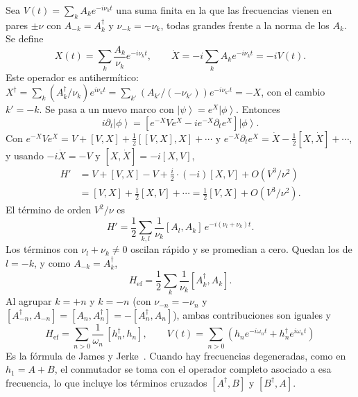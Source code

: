 \documentclass[11pt,a4paper]{article}
\newcommand{\ket}[1]{\left|#1\right\rangle}
\newcommand{\Href}{H_{\mathrm{ef}}}
\theoremstyle{definition}
\begin{document}
\label{sec:JJ}


Sea $V(t)=\sum_{k}A_ke^{-i\nu_kt}$ una suma finita en la que las frecuencias vienen en pares $\pm\nu$ con $A_{-k}=A_k^{\dagger}$ y $\nu_{-k}=-\nu_k$, todas grandes frente a la norma de los $A_k$. Se define
\begin{equation}
X(t)=\sum_k\frac{A_k}{\nu_k}e^{-i\nu_kt},\qquad \dot X=-i\sum_kA_ke^{-i\nu_kt}=-iV(t).
\end{equation}
Este operador es antihermítico: $X^{\dagger}=\sum_k(A_k^{\dagger}/\nu_k)e^{i\nu_kt}=\sum_{k'}(A_{k'}/(-\nu_{k'}))e^{-i\nu_{k'}t}=-X$, con el cambio $k'=-k$. Se pasa a un nuevo marco con $\ket{\psi}=e^{X}\ket{\phi}$. Entonces
\begin{equation}
i\partial_t\ket{\phi}=\left[e^{-X}Ve^{X}-ie^{-X}\partial_te^{X}\right]\ket{\phi}.
\end{equation}
Con $e^{-X}Ve^{X}=V+[V,X]+\tfrac12[[V,X],X]+\cdots$ y $e^{-X}\partial_te^{X}=\dot X-\tfrac12[X,\dot X]+\cdots$, y usando $-i\dot X=-V$ y $[X,\dot X]=-i[X,V]$,
\begin{align}
H'&=V+[V,X]-V+\tfrac{i}{2}\cdot(-i)[X,V]+O(V^3/\nu^2)\nonumber\\
&=[V,X]+\tfrac12[X,V]+\cdots=\tfrac12[V,X]+O(V^3/\nu^2).
\end{align}
El término de orden $V^2/\nu$ es
\begin{equation}
H'=\frac12\sum_{k,l}\frac{1}{\nu_k}[A_l,A_k]\,e^{-i(\nu_l+\nu_k)t}.
\end{equation}
Los términos con $\nu_l+\nu_k\neq0$ oscilan rápido y se promedian a cero. Quedan los de $l=-k$, y como $A_{-k}=A_k^{\dagger}$,
\begin{equation}
\Href=\frac12\sum_k\frac{1}{\nu_k}[A_k^{\dagger},A_k].
\end{equation}
Al agrupar $k=+n$ y $k=-n$ (con $\nu_{-n}=-\nu_n$ y $[A_{-n}^{\dagger},A_{-n}]=[A_n,A_n^{\dagger}]=-[A_n^{\dagger},A_n]$), ambas contribuciones son iguales y
\begin{equation}
\boxed{\Href=\sum_{n>0}\frac{1}{\omega_n}\,[h_n^{\dagger},h_n],\qquad V(t)=\sum_{n>0}\left(h_ne^{-i\omega_nt}+h_n^{\dagger}e^{i\omega_nt}\right)}
\label{eq:JJ}
\end{equation}
Es la fórmula de James y Jerke~\cite{JamesJerke2007}. Cuando hay frecuencias degeneradas, como en $h_1=A+B$, el conmutador se toma con el operador completo asociado a esa frecuencia, lo que incluye los términos cruzados $[A^{\dagger},B]$ y $[B^{\dagger},A]$.
\end{document}
